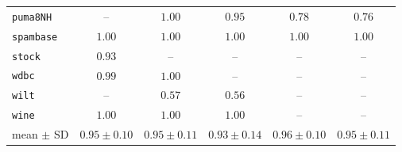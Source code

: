 {\begin{tabular}{@{}lccccc@{}}
\texttt{puma8NH} & -- & $1.00$ & $0.95$ & $0.78$ & $0.76$ \\
\texttt{spambase} & $1.00$ & $1.00$ & $1.00$ & $1.00$ & $1.00$ \\
\texttt{stock} & $0.93$ & -- & -- & -- & -- \\
\texttt{wdbc} & $0.99$ & $1.00$ & -- & -- & -- \\
\texttt{wilt} & -- & $0.57$ & $0.56$ & -- & -- \\
\texttt{wine} & $1.00$ & $1.00$ & $1.00$ & -- & -- \\
\midrule mean $\pm$ SD & $0.95 \pm 0.10$ & $0.95 \pm 0.11$ & $0.93 \pm 0.14$ & $0.96 \pm 0.10$ & $0.95 \pm 0.11$ \\
\bottomrule\end{tabular}}
